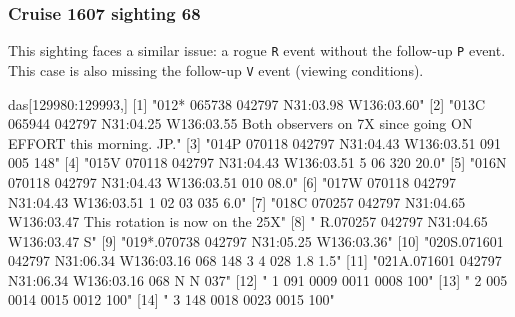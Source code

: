 \documentclass[
]{book}
\newenvironment{Shaded}{\begin{snugshade}}{\end{snugshade}}
\newcommand{\DecValTok}[1]{\textcolor[rgb]{0.00,0.00,0.81}{#1}}
\newcommand{\NormalTok}[1]{#1}
\newcommand{\SpecialCharTok}[1]{\textcolor[rgb]{0.00,0.00,0.00}{#1}}
\newcommand{\StringTok}[1]{\textcolor[rgb]{0.31,0.60,0.02}{#1}}
\begin{document}
\hypertarget{cruise-1607-sighting-68}{%
\subsubsection*{Cruise 1607 sighting 68}\label{cruise-1607-sighting-68}}

This sighting faces a similar issue: a rogue \texttt{R} event without the follow-up \texttt{P} event. This case is also missing the follow-up \texttt{V} event (viewing conditions).

\begin{Shaded}
\begin{Highlighting}[]
\NormalTok{das[}\DecValTok{129980}\SpecialCharTok{:}\DecValTok{129993}\NormalTok{,] }
\NormalTok{ [}\DecValTok{1}\NormalTok{] }\StringTok{"012* 065738 042797 N31:03.98 W136:03.60"}                                                              
\NormalTok{ [}\DecValTok{2}\NormalTok{] }\StringTok{"013C 065944 042797 N31:04.25 W136:03.55 Both observers on 7X since going ON EFFORT this morning.  JP."}
\NormalTok{ [}\DecValTok{3}\NormalTok{] }\StringTok{"014P 070118 042797 N31:04.43 W136:03.51  091  005  148"}                                               
\NormalTok{ [}\DecValTok{4}\NormalTok{] }\StringTok{"015V 070118 042797 N31:04.43 W136:03.51    5   06  320      20.0"}                                     
\NormalTok{ [}\DecValTok{5}\NormalTok{] }\StringTok{"016N 070118 042797 N31:04.43 W136:03.51  010 08.0"}                                                    
\NormalTok{ [}\DecValTok{6}\NormalTok{] }\StringTok{"017W 070118 042797 N31:04.43 W136:03.51    1   02   03  035  6.0"}                                     
\NormalTok{ [}\DecValTok{7}\NormalTok{] }\StringTok{"018C 070257 042797 N31:04.65 W136:03.47 This rotation is now on the 25X"}                              
\NormalTok{ [}\DecValTok{8}\NormalTok{] }\StringTok{"   R.070257 042797 N31:04.65 W136:03.47    S"}                                                         
\NormalTok{ [}\DecValTok{9}\NormalTok{] }\StringTok{"019*.070738 042797 N31:05.25 W136:03.36"}                                                              
\NormalTok{[}\DecValTok{10}\NormalTok{] }\StringTok{"020S.071601 042797 N31:06.34 W136:03.16  068  148    3    4  028  1.8  1.5"}                           
\NormalTok{[}\DecValTok{11}\NormalTok{] }\StringTok{"021A.071601 042797 N31:06.34 W136:03.16  068         N    N  037"}                                     
\NormalTok{[}\DecValTok{12}\NormalTok{] }\StringTok{"   1                                     091 0009 0011 0008  100"}                                     
\NormalTok{[}\DecValTok{13}\NormalTok{] }\StringTok{"   2                                     005 0014 0015 0012  100"}                                     
\NormalTok{[}\DecValTok{14}\NormalTok{] }\StringTok{"   3                                     148 0018 0023 0015  100"}                                     
\end{Highlighting}
\end{Shaded}
\end{document}
